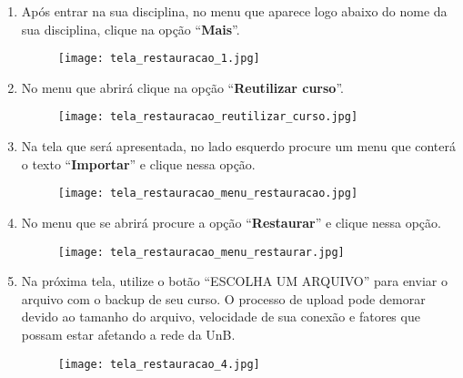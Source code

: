 \documentclass[12pt]{report}
\begin{document}
\begin{enumerate}[\bf 1)]
	\item Ap\'os entrar na sua disciplina, no menu que aparece logo abaixo do nome da sua disciplina, clique na opção ``\textbf{Mais}''.
	\begin{figure}[H]
    	\centering
    	\hspace*{-2.5cm}\texttt{[image: tela\_restauracao\_1.jpg]}
  	\end{figure}

  	\newpage

	\item No menu que abrirá clique na opção ``\textbf{Reutilizar curso}''.
	\begin{figure}[H]
    	\centering
    	\hspace*{-2.5cm}\texttt{[image: tela\_restauracao\_reutilizar\_curso.jpg]}
  	\end{figure}

  	\newpage

    \item Na tela que será apresentada, no lado esquerdo procure um menu que conterá o texto ``\textbf{Importar}'' e clique nessa opção.
	\begin{figure}[H]
    	\centering
    	\hspace*{-2.5cm}\texttt{[image: tela\_restauracao\_menu\_restauracao.jpg]}
  	\end{figure}

  	\newpage

    \item No menu que se abrirá procure a opção ``\textbf{Restaurar}'' e clique nessa opção.
	\begin{figure}[H]
    	\centering
    	\hspace*{-2.5cm}\texttt{[image: tela\_restauracao\_menu\_restaurar.jpg]}
  	\end{figure}

  	\newpage


	\item Na pr\'oxima tela, utilize o bot\~ao ``ESCOLHA UM ARQUIVO'' para enviar o arquivo com o backup de seu curso. O processo de upload pode demorar devido ao tamanho do arquivo, velocidade de sua conex\~ao e fatores que possam estar afetando a rede da UnB.
	\begin{figure}[H]
    	\centering
    	\hspace*{-2.5cm}\texttt{[image: tela\_restauracao\_4.jpg]}
  	\end{figure}


\end{enumerate}
\end{document}
